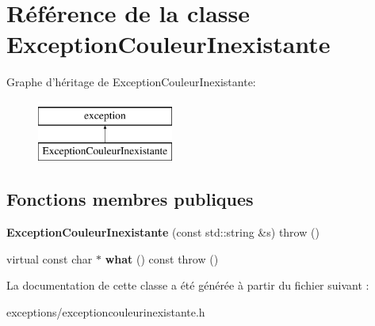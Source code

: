 \hypertarget{class_exception_couleur_inexistante}{\section{Référence de la classe Exception\+Couleur\+Inexistante}
\label{class_exception_couleur_inexistante}
}
Graphe d'héritage de Exception\+Couleur\+Inexistante\+:\begin{figure}[H]
\begin{center}
\leavevmode
\includegraphics[height=2.000000cm]{class_exception_couleur_inexistante}
\end{center}
\end{figure}
\subsection*{Fonctions membres publiques}
\begin{DoxyCompactItemize}
\item 
\hypertarget{class_exception_couleur_inexistante_aadb935826862d60e9f458196b37ad39b}{{\bfseries Exception\+Couleur\+Inexistante} (const std\+::string \&s)  throw ()}\label{class_exception_couleur_inexistante_aadb935826862d60e9f458196b37ad39b}

\item 
\hypertarget{class_exception_couleur_inexistante_a1929b8f3684ba148506d21e6fe049ac7}{virtual const char $\ast$ {\bfseries what} () const   throw ()}\label{class_exception_couleur_inexistante_a1929b8f3684ba148506d21e6fe049ac7}

\end{DoxyCompactItemize}


La documentation de cette classe a été générée à partir du fichier suivant \+:\begin{DoxyCompactItemize}
\item 
exceptions/exceptioncouleurinexistante.\+h\end{DoxyCompactItemize}
